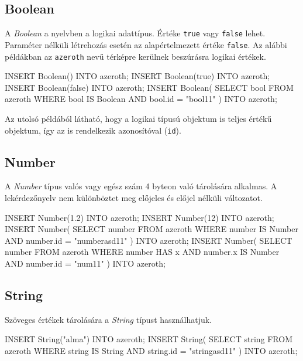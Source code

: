 \subsection{Boolean}

A \textit{Boolean} a nyelvben a logikai adattípus. Értéke \texttt{true} vagy \texttt{false} lehet. Paraméter nélküli létrehozás esetén az alapértelmezett értéke \texttt{false}. Az alábbi példákban az \texttt{azeroth} nevű térképre kerülnek beszúrásra logikai értékek.

\begin{sql}
INSERT Boolean() INTO azeroth;
INSERT Boolean(true) INTO azeroth; 
INSERT Boolean(false) INTO azeroth;
INSERT Boolean(
    SELECT bool FROM azeroth
    WHERE bool IS Boolean AND bool.id = "bool11"
) INTO azeroth;
\end{sql}

Az utolsó példából látható, hogy a logikai típusú objektum is teljes értékű objektum, így az is rendelkezik azonosítóval (\texttt{id}).

\subsection{Number}

A \textit{Number} típus valós vagy egész szám 4 byteon való tárolására alkalmas. A lekérdezőnyelv nem különböztet meg előjeles és előjel nélküli változatot.

\begin{sql}
INSERT Number(1.2) INTO azeroth;
INSERT Number(12) INTO azeroth;
INSERT Number(
    SELECT number FROM azeroth
    WHERE number IS Number AND number.id = "numberasd11"
) INTO azeroth;
INSERT Number(
    SELECT number FROM azeroth
    WHERE number HAS x AND number.x IS Number AND number.id = "num11"
) INTO azeroth;
\end{sql}

\subsection{String}

Szöveges értékek tárolására a \textit{String} típust használhatjuk.

\begin{sql}
INSERT String("alma") INTO azeroth;
INSERT String(
    SELECT string FROM azeroth
    WHERE string IS String AND string.id = "stringasd11"
)
INTO azeroth;
\end{sql}

